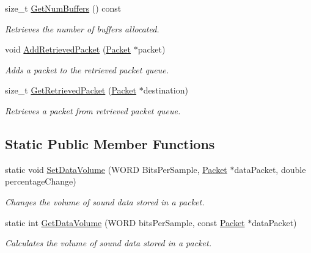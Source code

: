 \begin{DoxyCompactItemize}
size\_\-t \hyperlink{class_sound_instance_input_af5f73fe0e1cff2537a1128f6c0589125}{GetNumBuffers} () const 
\begin{DoxyCompactList}\small\item\em Retrieves the number of buffers allocated. \item\end{DoxyCompactList}\item 
void \hyperlink{class_sound_instance_input_a47be3b5c0bb69c7a93b09961a9b0b06a}{AddRetrievedPacket} (\hyperlink{class_packet}{Packet} $\ast$packet)
\begin{DoxyCompactList}\small\item\em Adds a packet to the retrieved packet queue. \item\end{DoxyCompactList}\item 
size\_\-t \hyperlink{class_sound_instance_input_aed86fa630f2535e41f959740110f94f9}{GetRetrievedPacket} (\hyperlink{class_packet}{Packet} $\ast$destination)
\begin{DoxyCompactList}\small\item\em Retrieves a packet from retrieved packet queue. \item\end{DoxyCompactList}\end{DoxyCompactItemize}
\subsection*{Static Public Member Functions}
\begin{DoxyCompactItemize}
\item 
static void \hyperlink{class_sound_instance_input_a3328664cd2f5e835d7ec1d25bfbfcd22}{SetDataVolume} (WORD BitsPerSample, \hyperlink{class_packet}{Packet} $\ast$dataPacket, double percentageChange)
\begin{DoxyCompactList}\small\item\em Changes the volume of sound data stored in a packet. \item\end{DoxyCompactList}\item 
static int \hyperlink{class_sound_instance_input_a8fda6be24c9f827a99a88e426126a49b}{GetDataVolume} (WORD bitsPerSample, const \hyperlink{class_packet}{Packet} $\ast$dataPacket)
\begin{DoxyCompactList}\small\item\em Calculates the volume of sound data stored in a packet. \item\end{DoxyCompactList}\end{DoxyCompactItemize}
